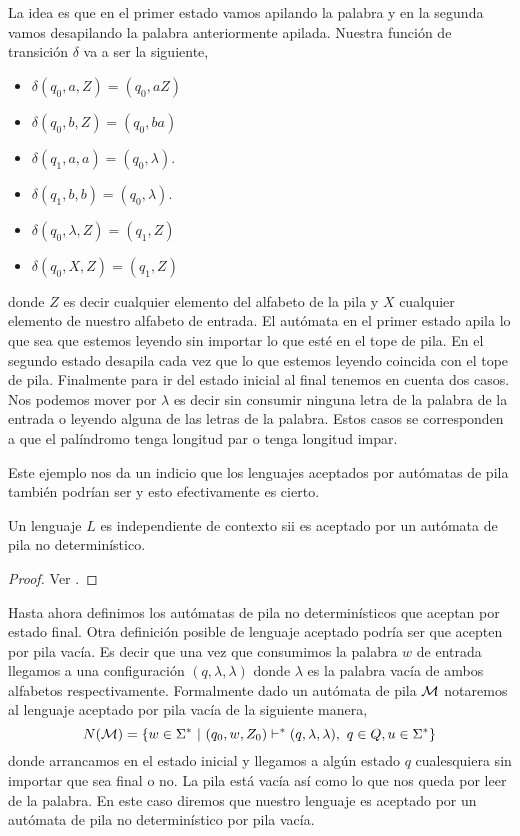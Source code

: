 \documentclass[tesis.tex]{subfiles}
\begin{document}
\begin{ej}
	La idea es que en el primer estado vamos apilando la palabra y en la segunda vamos desapilando la palabra anteriormente apilada. 
	Nuestra función de transición $\delta$ va a ser la siguiente,
	\begin{itemize}
		\item $\delta(q_0,a,Z) = (q_0,aZ)$ 
		\item $\delta(q_0,b,Z) = (q_0,ba)$ 
		\item $\delta(q_1,a,a) = (q_0,\lambda)$.
		\item $\delta(q_1,b,b) = (q_0,\lambda)$.
		\item $\delta (q_0, \lambda, Z) = (q_1,Z)$
		\item $\delta (q_0, X, Z) = (q_1, Z)$ 
	\end{itemize}
	donde $Z$ es decir cualquier elemento del alfabeto de la pila y $X$ cualquier elemento de nuestro alfabeto de entrada. 
	El autómata en el primer estado apila lo que sea que estemos leyendo sin importar lo que esté en el tope de pila. 
	En el segundo estado desapila cada vez que lo que estemos leyendo coincida con el tope de pila. 
	Finalmente para ir del estado inicial al final tenemos en cuenta dos casos. 
	Nos podemos mover por $\lambda$ es decir sin consumir ninguna letra de la palabra de la entrada o leyendo alguna de las letras de la palabra. 
	Estos casos se corresponden a que el palíndromo tenga longitud par o tenga longitud impar.	
\end{ej}

Este ejemplo nos da un indicio que los lenguajes aceptados por autómatas de pila también podrían ser \ic y esto efectivamente es cierto.

\medskip

\begin{teo}\label{teo_ic_apnd}
	Un lenguaje $L$ es independiente de contexto sii es aceptado por un autómata de pila no determinístico.
\end{teo}

\begin{proof}
	Ver \cite{hopcraft-ullman}.
\end{proof}



Hasta ahora definimos los autómatas de pila no determinísticos que aceptan por estado final. Otra definición posible de lenguaje aceptado podría ser que acepten por pila vacía. 
Es decir que una vez que consumimos la palabra $w$ de entrada llegamos a una configuración $(q, \lambda, \lambda)$ donde $\lambda$ es la palabra vacía de ambos alfabetos respectivamente. Formalmente dado un autómata de pila $\cal M$  notaremos al lenguaje aceptado por pila vacía de la siguiente manera,
\begin{equation*}
	N({\cal M}) = \{ w \in \Sigma^* \ | \ (q_0,w,Z_0) \vdash^* (q, \lambda, \lambda), \ q \in Q, u \in \Sigma^*    \}
\end{equation*}
donde arrancamos en el estado inicial y llegamos a algún estado $q$ cualesquiera sin importar que sea final o no.
La pila está vacía así como lo que nos queda por leer de la palabra. 
En este caso diremos que nuestro lenguaje es aceptado por un autómata de pila no determinístico por pila vacía.
\end{document}
